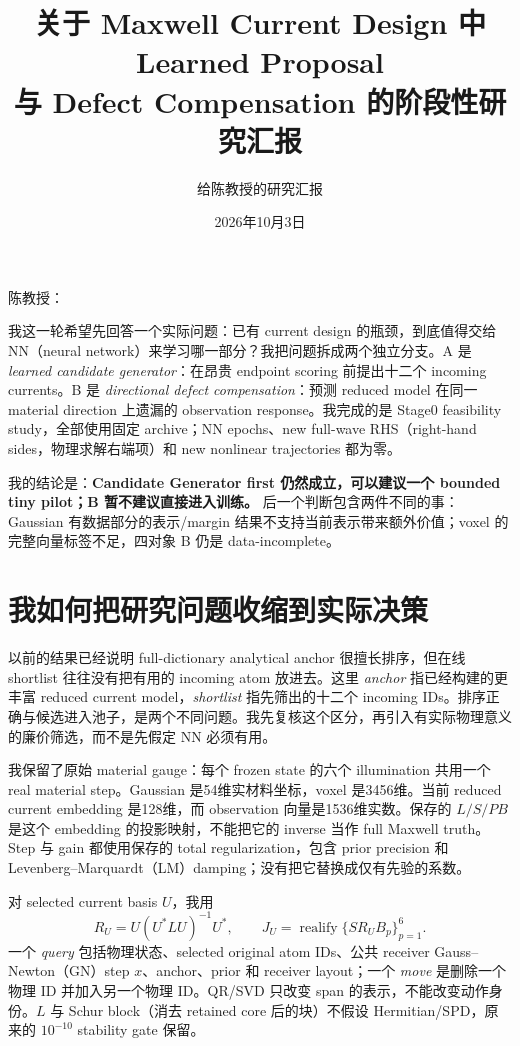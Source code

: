 \documentclass[UTF8,11pt,a4paper,fontset=fandol]{ctexart}
\title{关于 Maxwell Current Design 中 Learned Proposal\\与 Defect Compensation 的阶段性研究汇报}
\author{给陈教授的研究汇报}
\date{2026年10月3日}
\newcommand{\op}[1]{\operatorname{#1}}
\begin{document}
\maketitle
陈教授：

我这一轮希望先回答一个实际问题：已有 current design 的瓶颈，到底值得交给 NN（neural network）来学习哪一部分？我把问题拆成两个独立分支。A 是 \emph{learned candidate generator}：在昂贵 endpoint scoring 前提出十二个 incoming currents。B 是 \emph{directional defect compensation}：预测 reduced model 在同一 material direction 上遗漏的 observation response。我完成的是 Stage0 feasibility study，全部使用固定 archive；NN epochs、new full-wave RHS（right-hand sides，物理求解右端项）和 new nonlinear trajectories 都为零。

我的结论是：\textbf{Candidate Generator first 仍然成立，可以建议一个 bounded tiny pilot；B 暂不建议直接进入训练。} 后一个判断包含两件不同的事：Gaussian 有数据部分的表示/margin 结果不支持当前表示带来额外价值；voxel 的完整向量标签不足，四对象 B 仍是 data-incomplete。

\section{我如何把研究问题收缩到实际决策}
以前的结果已经说明 full-dictionary analytical anchor 很擅长排序，但在线 shortlist 往往没有把有用的 incoming atom 放进去。这里 \emph{anchor} 指已经构建的更丰富 reduced current model，\emph{shortlist} 指先筛出的十二个 incoming IDs。排序正确与候选进入池子，是两个不同问题。我先复核这个区分，再引入有实际物理意义的廉价筛选，而不是先假定 NN 必须有用。

我保留了原始 material gauge：每个 frozen state 的六个 illumination 共用一个 real material step。Gaussian 是54维实材料坐标，voxel 是3456维。当前 reduced current embedding 是128维，而 observation 向量是1536维实数。保存的 $L/S/PB$ 是这个 embedding 的投影映射，不能把它的 inverse 当作 full Maxwell truth。Step 与 gain 都使用保存的 total regularization，包含 prior precision 和 Levenberg--Marquardt（LM）damping；没有把它替换成仅有先验的系数。

对 selected current basis $U$，我用
\[
 R_U=U(U^*LU)^{-1}U^*,\qquad J_U=\op{realify}\{SR_UB_p\}_{p=1}^6.
\]
一个 \emph{query} 包括物理状态、selected original atom IDs、公共 receiver Gauss--Newton（GN）step $x$、anchor、prior 和 receiver layout；一个 \emph{move} 是删除一个物理 ID 并加入另一个物理 ID。QR/SVD 只改变 span 的表示，不能改变动作身份。$L$ 与 Schur block（消去 retained core 后的块）不假设 Hermitian/SPD，原来的 $10^{-10}$ stability gate 保留。
\end{document}
